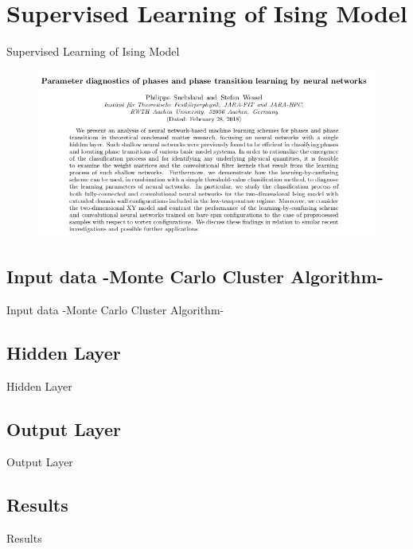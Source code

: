 \documentclass[mathserif]{beamer}
\begin{document}
\section{Supervised Learning of Ising Model}
\begin{frame}{Supervised Learning of Ising Model}

\begin{figure}[H]
\centering
\includegraphics[scale=0.4]{figures/wessel.png}
\end{figure}
\end{frame}

\subsection{Input data -Monte Carlo Cluster Algorithm-}
\begin{frame}{Input data -Monte Carlo Cluster Algorithm-}

\end{frame}

\subsection{Hidden Layer}
\begin{frame}{Hidden Layer}

\end{frame}

\subsection{Output Layer}
\begin{frame}{Output Layer}

\end{frame}

\subsection{Results}
\begin{frame}{Results}

\end{frame}
\end{document}
